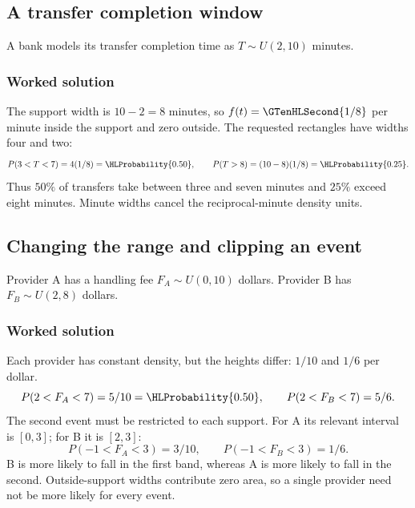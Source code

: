 \subsection{A transfer completion window}\label{prob:sec:general-worked0}
A bank models its transfer completion time as $T\sim U(2,10)$ minutes.
\subsubsection*{Worked solution}\label{sol:sec:general-worked0}
The support width is $10-2=8$ minutes, so $f(t)=\GTenHLSecond{1/8}$ per minute inside the support and zero outside. The requested rectangles have widths four and two:
\[
P(3<T<7)=4(1/8)=\HLProbability{0.50},\qquad
P(T>8)=(10-8)(1/8)=\HLProbability{0.25}.
\]
Thus $50\%$ of transfers take between three and seven minutes and $25\%$ exceed eight minutes. Minute widths cancel the reciprocal-minute density units.


\subsection{Changing the range and clipping an event}\label{prob:sec:general-worked1}
Provider A has a handling fee $F_A\sim U(0,10)$ dollars. Provider B has $F_B\sim U(2,8)$ dollars.
\subsubsection*{Worked solution}\label{sol:sec:general-worked1}
Each provider has constant density, but the heights differ: $1/10$ and $1/6$ per dollar.
\[
P(2<F_A<7)=5/10=\HLProbability{0.50},\qquad
P(2<F_B<7)=5/6.
\]
The second event must be restricted to each support. For A its relevant interval is $[0,3]$; for B it is $[2,3]$:
\[
P(-1<F_A<3)=3/10,\qquad P(-1<F_B<3)=1/6.
\]
B is more likely to fall in the first band, whereas A is more likely to fall in the second. Outside-support widths contribute zero area, so a single provider need not be more likely for every event.


